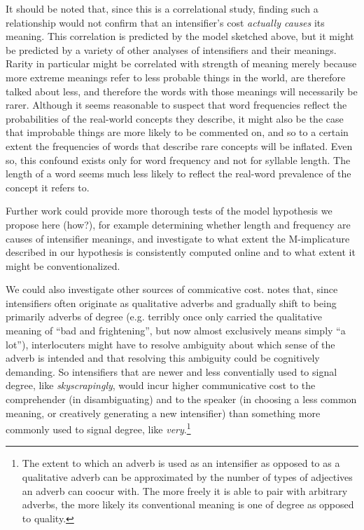 \documentclass[10pt,letterpaper]{article}
\newcommand{\w}[1]{\emph{#1}}
\newcommand{\todo}[1]{{\color{red}#1}}
\begin{document}
It should be noted that, since this is a correlational study, finding such a relationship would not confirm that an intensifier's cost \emph{actually causes} its meaning. This correlation is predicted by the model sketched above, but it might be predicted by a variety of other analyses of intensifiers and their meanings. Rarity in particular might be correlated with strength of meaning merely because more extreme meanings refer to less probable things in the world, are therefore talked about less, and therefore the words with those meanings will necessarily be rarer. Although it seems reasonable to suspect that word frequencies reflect the probabilities of the real-world concepts they describe, it might also be the case that improbable things are more likely to be commented on, and so to a certain extent the frequencies of words that describe rare concepts will be inflated. Even so, this confound exists only for word frequency and not for syllable length.
The length of a word seems much less likely to reflect the real-word prevalence of the concept it refers to.

Further work could provide more thorough tests of the model hypothesis we propose here \todo{(how?)}, for example determining whether length and frequency are causes of intensifier meanings, and investigate to what extent the M-implicature described in our hypothesis is consistently computed online and to what extent it might be conventionalized.

We could also investigate other sources of commicative cost.  %
notes that, since intensifiers often originate as qualitative adverbs and gradually shift to being primarily adverbs of degree (e.g. terribly once only carried the qualitative meaning of ``bad and frightening'', but now almost exclusively means simply ``a lot''), interlocuters might have to resolve ambiguity about which sense of the adverb is intended and that resolving this ambiguity could be cognitively demanding. So intensifiers that are newer and less conventially used to signal degree, like \w{skyscrapingly}, would incur higher communicative cost to the comprehender (in disambiguating) and to the speaker (in choosing a less common meaning, or creatively generating a new intensifier) than something more commonly used to signal degree, like \w{very}.\footnote{The extent to which an adverb is used as an intensifier as opposed to as a qualitative adverb can be approximated by the number of types of adjectives an adverb can coocur with. The more freely it is able to pair with arbitrary adverbs, the more likely its conventional meaning is one of degree as opposed to quality.}
\end{document}
